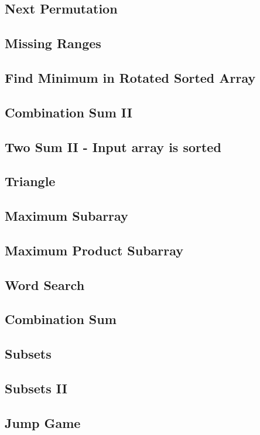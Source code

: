 \documentclass[12pt]{book}
\begin{document}
\subsection{Next Permutation}
\label{sec-1-2-16}
\subsection{Missing Ranges}
\label{sec-1-2-17}
\subsection{Find Minimum in Rotated Sorted Array}
\label{sec-1-2-18}
\subsection{Combination Sum II}
\label{sec-1-2-19}
\subsection{Two Sum II - Input array is sorted}
\label{sec-1-2-20}
\subsection{Triangle}
\label{sec-1-2-21}
\subsection{Maximum Subarray}
\label{sec-1-2-22}
\subsection{Maximum Product Subarray}
\label{sec-1-2-23}
\subsection{Word Search}
\label{sec-1-2-24}
\subsection{Combination Sum}
\label{sec-1-2-25}
\subsection{Subsets}
\label{sec-1-2-26}
\subsection{Subsets II}
\label{sec-1-2-27}
\subsection{Jump Game}
\label{sec-1-2-28}
\end{document}
